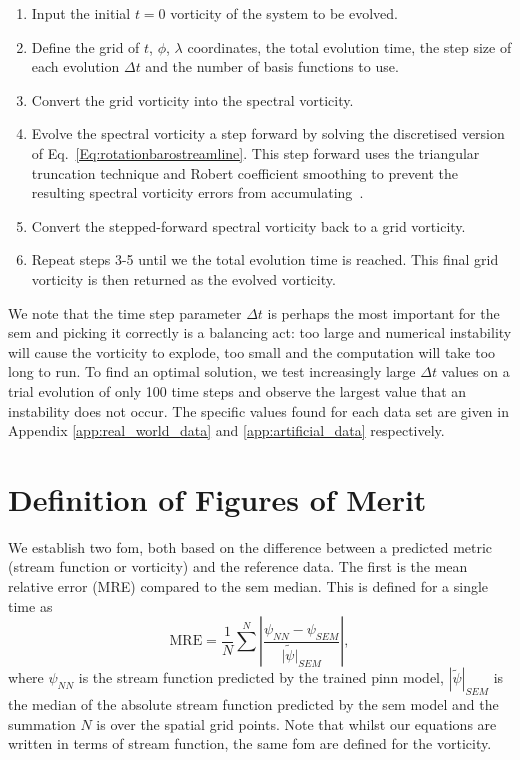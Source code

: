 \documentclass[aps,pra,a4paper,twocolumn,longbibliography,groupedaddress]{revtex4-2}
\begin{document}
\begin{enumerate}
    \item Input the initial $t=0$ vorticity of the system to be evolved.
    \item Define the grid of $t$, $\phi$, $\lambda$ coordinates, the total evolution time, the step size of each evolution $\Delta t$ and the number of basis functions to use.
    \item Convert the grid vorticity into the spectral vorticity.
    \item Evolve the spectral vorticity a step forward by solving the discretised version of Eq.~\eqref{Eq:rotationbarostreamline}. This step forward uses the triangular truncation technique and Robert coefficient smoothing to prevent the resulting spectral vorticity errors from accumulating~\cite{ecmwf_numerical}.
    \item Convert the stepped-forward spectral vorticity back to a grid vorticity. 
    \item Repeat steps 3-5 until we the total evolution time is reached. This final grid vorticity is then returned as the evolved vorticity. 
\end{enumerate}

We note that the time step parameter $\Delta t$ is perhaps the most important for the \gls{sem} and picking it correctly is a balancing act: too large and numerical instability will cause the vorticity to explode, too small and the computation will take too long to run. To find an optimal solution, we test increasingly large $\Delta t$ values on a trial evolution of only 100 time steps and observe the largest value that an instability does not occur. The specific values found for each data set are given in Appendix \ref{app:real_world_data} and \ref{app:artificial_data} respectively.

\section{Definition of Figures of Merit}\label{app:fom}

We establish two \gls{fom}, both based on the difference between a predicted metric (stream function or vorticity) and the reference data. The first is the mean relative error (MRE) compared to the \gls{sem} median. This is defined for a single time as
\begin{equation}\label{eq:MRE}
    \text{MRE} = \frac{1}{N}\sum^N \left| \frac{\psi_{NN} - \psi_{SEM}}{\tilde{|\psi|}_{SEM}}\right|,
\end{equation}
where $\psi_{NN}$ is the stream function predicted by the trained \gls{pinn} model, ${|\tilde{\psi}|_{SEM}}$ is the median of the absolute stream function predicted by the \gls{sem} model and the summation $N$ is over the spatial grid points. Note that whilst our equations are written in terms of stream function, the same \gls{fom} are defined for the vorticity.
\end{document}
